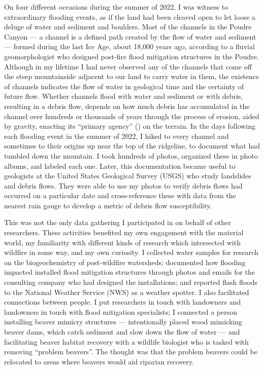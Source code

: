 \documentclass[
]{article}
\begin{document}
On four different occasions during the summer of 2022, I was witness to extraordinary flooding events, as if the land had been cleaved open to let loose a deluge of water and sediment and boulders. Most of the channels in the Poudre Canyon --- a channel is a defined path created by the flow of water and sediment --- formed during the last Ice Age, about 18,000 years ago, according to a fluvial geomorphologist who designed post-fire flood mitigation structures in the Poudre. Although in my lifetime I had never observed any of the channels that come off the steep mountainside adjacent to our land to carry water in them, the existence of channels indicates the flow of water in geological time and the certainty of future flow. Whether channels flood with water and sediment or with debris, resulting in a debris flow, depends on how much debris has accumulated in the channel over hundreds or thousands of years through the process of erosion, aided by gravity, enacting its ``primary agency'' () on the terrain. In the days following each flooding event in the summer of 2022, I hiked to every channel and sometimes to their origins up near the top of the ridgeline, to document what had tumbled down the mountain. I took hundreds of photos, organized these in photo albums, and labeled each one. Later, this documentation became useful to geologists at the United States Geological Survey (USGS) who study landslides and debris flows. They were able to use my photos to verify debris flows had occurred on a particular date and cross-reference these with data from the nearest rain gauge to develop a metric of debris flow susceptibility.

This was not the only data gathering I participated in on behalf of other researchers. These activities benefited my own engagement with the material world, my familiarity with different kinds of research which intersected with wildfire in some way, and my own curiosity. I collected water samples for research on the biogeochemistry of post-wildfire watersheds; documented how flooding impacted installed flood mitigation structures through photos and emails for the consulting company who had designed the installations; and reported flash floods to the National Weather Service (NWS) as a weather spotter. I also facilitated connections between people. I put researchers in touch with landowners and landowners in touch with flood mitigation specialists; I connected a person installing beaver mimicry structures --- intentionally placed wood mimicking beaver dams, which catch sediment and slow down the flow of water --- and facilitating beaver habitat recovery with a wildlife biologist who is tasked with removing ``problem beavers''. The thought was that the problem beavers could be relocated to areas where beavers would aid riparian recovery.
\end{document}
